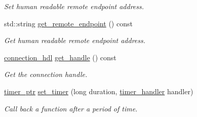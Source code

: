 \begin{DoxyCompactItemize}
\begin{DoxyCompactList}\small\item\em Set human readable remote endpoint address. \end{DoxyCompactList}\item 
std\+::string \hyperlink{classwebsocketpp_1_1transport_1_1stub_1_1connection_a203a8617c89816931fbda164cfd6a2cd}{get\+\_\+remote\+\_\+endpoint} () const 
\begin{DoxyCompactList}\small\item\em Get human readable remote endpoint address. \end{DoxyCompactList}\item 
\hyperlink{namespacewebsocketpp_a6b3d26a10ee7229b84b776786332631d}{connection\+\_\+hdl} \hyperlink{classwebsocketpp_1_1transport_1_1stub_1_1connection_a6f21236c455aa693b1c06d725b8cd31c}{get\+\_\+handle} () const 
\begin{DoxyCompactList}\small\item\em Get the connection handle. \end{DoxyCompactList}\item 
\hyperlink{classwebsocketpp_1_1transport_1_1stub_1_1connection_a905c3e6ee1e0245190b77786058482f6}{timer\+\_\+ptr} \hyperlink{classwebsocketpp_1_1transport_1_1stub_1_1connection_a0566c24deef4c7e5bff957510c366b26}{set\+\_\+timer} (long duration, \hyperlink{namespacewebsocketpp_1_1transport_a946cc56ff41139f3002149c15fd87bc9}{timer\+\_\+handler} handler)
\begin{DoxyCompactList}\small\item\em Call back a function after a period of time. \end{DoxyCompactList}\end{DoxyCompactItemize}

